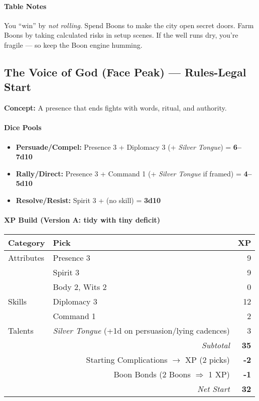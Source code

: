 \documentclass[11pt]{book}
\begin{document}
\paragraph{Table Notes}
You “win” by \emph{not rolling}. Spend Boons to make the city open secret doors. Farm Boons by taking calculated risks in setup scenes. If the well runs dry, you’re fragile — so keep the Boon engine humming.

\bigskip

\subsection*{The Voice of God (Face Peak) — Rules-Legal Start}
\textbf{Concept:} A presence that ends fights with words, ritual, and authority.

\paragraph{Dice Pools}
\begin{itemize}
  \item \textbf{Persuade/Compel:} Presence 3 + Diplomacy 3 (+ \emph{Silver Tongue}) = \textbf{6–7d10}
  \item \textbf{Rally/Direct:} Presence 3 + Command 1 (+ \emph{Silver Tongue} if framed) = \textbf{4–5d10}
  \item \textbf{Resolve/Resist:} Spirit 3 + (no skill) = \textbf{3d10}
\end{itemize}

\paragraph{XP Build (Version A: tidy with tiny deficit)}
\begin{tabular}{@{}llr@{}}
\toprule
\textbf{Category} & \textbf{Pick} & \textbf{XP} \\
\midrule
Attributes & Presence 3 & 9 \\
           & Spirit 3 & 9 \\
           & Body 2, Wits 2 & 0 \\
Skills     & Diplomacy 3 & 12 \\
           & Command 1 & 2 \\
Talents    & \emph{Silver Tongue} (+1d on persuasion/lying cadences) & 3 \\
\midrule
\multicolumn{2}{r}{\textit{Subtotal}} & \textbf{35} \\
\multicolumn{2}{r}{Starting Complications $\rightarrow$ XP (2 picks)} & \textbf{-2} \\
\multicolumn{2}{r}{Boon Bonds (2 Boons $\Rightarrow$ 1 XP)} & \textbf{-1} \\
\midrule
\multicolumn{2}{r}{\textit{Net Start}} & \textbf{32} \\
\bottomrule
\end{tabular}
\end{document}

